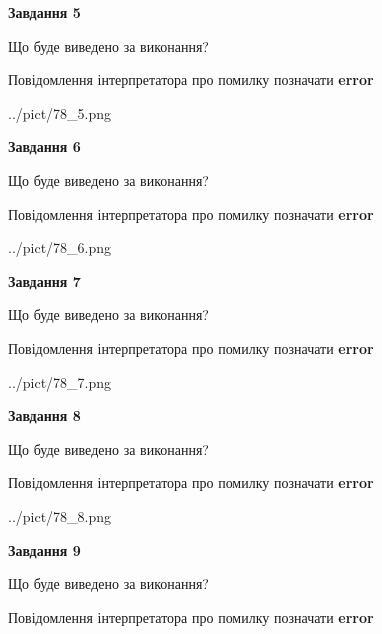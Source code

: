 \documentclass[11pt, ukrainian]{article}
\begin{document}
{\begin {large}
{\begin {center}\textbf{Завдання 5}\end {center}}\par
Що буде виведено за виконання? \par
Повідомлення інтерпретатора про помилку позначати \textbf{error}

\begin{center}
	{../pict/78_5.png}
\end{center}
\newpage

{\begin {center}\textbf{Завдання 6}\end {center}}\par
Що буде виведено за виконання? \par
Повідомлення інтерпретатора про помилку позначати \textbf{error}

\begin{center}
	{../pict/78_6.png}
\end{center}
\newpage

{\begin {center}\textbf{Завдання 7}\end {center}}\par
Що буде виведено за виконання? \par
Повідомлення інтерпретатора про помилку позначати \textbf{error}

\begin{center}
	{../pict/78_7.png}
\end{center}
\newpage

{\begin {center}\textbf{Завдання 8}\end {center}}\par
Що буде виведено за виконання? \par
Повідомлення інтерпретатора про помилку позначати \textbf{error}

\begin{center}
	{../pict/78_8.png}
\end{center}
\newpage

{\begin {center}\textbf{Завдання 9}\end {center}}\par
Що буде виведено за виконання? \par
Повідомлення інтерпретатора про помилку позначати \textbf{error}


\end{large}}
\end{document}
